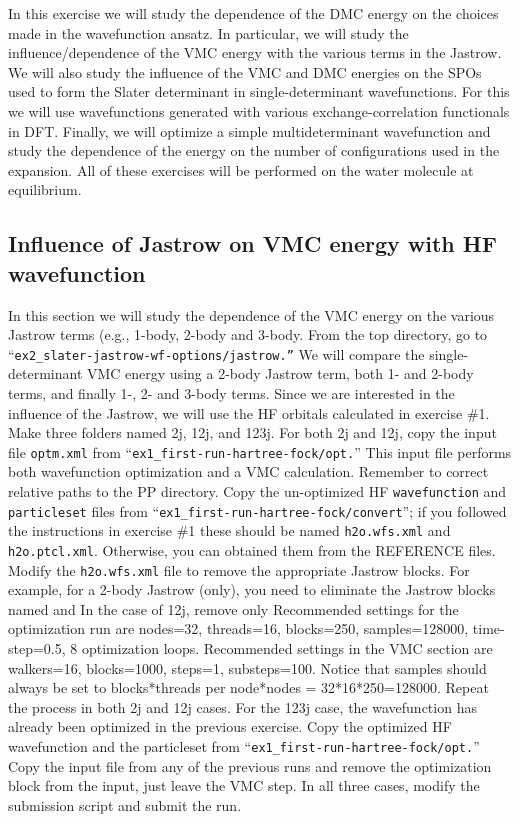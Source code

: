 In this exercise we will study the dependence of the DMC energy on the choices made
in the wavefunction ansatz. In particular, we will study the influence/dependence of the
VMC energy with the various terms in the Jastrow. We will also study the influence of
the VMC and DMC energies on the SPOs used to form the Slater determinant 
in single-determinant wavefunctions. For this we will use wavefunctions generated
with various exchange-correlation functionals in DFT. Finally, we will optimize a simple
multideterminant wavefunction and study the dependence of the energy on the number of
configurations used in the expansion. All of these exercises will be performed on the water 
molecule at equilibrium.


\subsection{Influence of Jastrow on VMC energy with HF wavefunction}
In this section we will study the dependence of the VMC energy on the various Jastrow
terms (e.g., 1-body, 2-body and 3-body. From the top directory, go to ``\texttt{ex2\_slater-jastrow-wf-options/jastrow.''} 
We will compare the single-determinant VMC energy using a 2-body 
Jastrow term, both 1- and 2-body terms, and finally 1-, 2- and 3-body
terms. Since we are interested in the influence of the Jastrow, we will use the HF orbitals
calculated in exercise \#1. Make three folders named 2j, 12j, and 123j. For both 2j and
12j, %
 copy the input file \texttt{optm.xml} %
from ``\texttt{ex1\_first-run-hartree-fock/opt.}'' This input file performs both wavefunction optimization 
and a VMC calculation. Remember to correct relative paths to the PP directory. Copy the un-optimized HF \texttt{wavefunction} and \texttt{particleset} files
from ``\texttt{ex1\_first-run-hartree-fock/convert}''; if you followed the instructions in exercise \#1 these should be
named \texttt{h2o.wfs.xml} and \texttt{h2o.ptcl.xml}. Otherwise, you can obtained them from the
REFERENCE files. Modify the \texttt{h2o.wfs.xml} file to remove the appropriate Jastrow
blocks. For example, for a 2-body Jastrow (only), you need to eliminate the Jastrow
blocks named  and  In the case of 12j, remove
only  Recommended settings for the optimization run are nodes=32,
threads=16, blocks=250, samples=128000, time-step=0.5, 8 optimization loops. Recommended settings in the
VMC section are walkers=16, blocks=1000, steps=1, substeps=100. Notice that
samples should always be set to blocks*threads per node*nodes = 32*16*250=128000. Repeat 
the process in both 2j and 12j cases. For the 123j case, the wavefunction has
already been optimized in the previous exercise. Copy the optimized HF wavefunction and
the particleset from ``\texttt{ex1\_first-run-hartree-fock/opt.}'' Copy the input file from any of the previous runs and remove the optimization block from the
input, just leave the VMC step. In all three cases, modify the submission script and submit the run.

